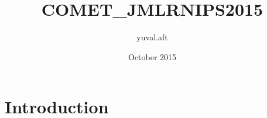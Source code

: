\documentclass{article}
\title{COMET_JMLRNIPS2015}
\author{yuval.aft }
\date{October 2015}
\begin{document}
\maketitle

\section{Introduction}
\end{document}
